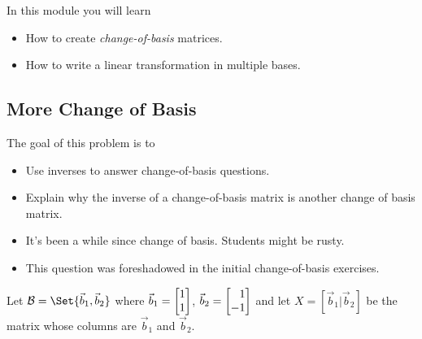 \begin{module}

	In this module you will learn
	\begin{itemize}
		\item How to create \emph{change-of-basis} matrices.
		\item How to write a linear transformation in multiple bases.
	\end{itemize}

	
	
\end{module}
	\bookonlynewpage
\subsection*{More Change of Basis}
	\question
	\begin{annotation}
		\begin{goals}

			The goal of this problem is to
			\begin{itemize}
				\item Use inverses to answer change-of-basis questions.
				\item Explain why the inverse of a change-of-basis matrix is another
					change of basis matrix.
			\end{itemize}
		\end{goals}

		\begin{notes}
			\begin{itemize}
				\item It's been a while since change of basis. Students might be rusty.
				\item This question was foreshadowed in the initial change-of-basis exercises.
			\end{itemize}
		\end{notes}
	\end{annotation}
	Let $\mathcal B=\Set{\vec b_1,\vec b_2}$ where $\vec b_1=\mat{1\\1}$, $\vec b_2=\mat{1\\-1}$
	and let $X=[\vec b_1|\vec b_2]$ be the matrix whose columns are $\vec b_1$ and $\vec b_2$.
